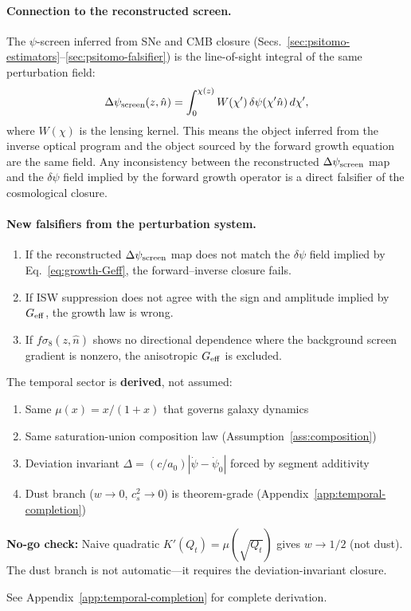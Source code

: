 \paragraph{Connection to the reconstructed screen.}
The $\psi$-screen inferred from SNe and CMB closure (Secs.~\ref{sec:psitomo-estimators}--\ref{sec:psitomo-falsifier}) is the line-of-sight integral of the same perturbation field:
\begin{equation}\label{eq:screen-integral}
\Delta\psi_{\rm screen}(z,\hat{n}) = \int_0^{\chi(z)} W(\chi')\,\delta\psi(\chi'\hat{n})\,d\chi',
\end{equation}
where $W(\chi)$ is the lensing kernel.  This means the object inferred from the inverse optical program and the object sourced by the forward growth equation are the same field.  Any inconsistency between the reconstructed $\Delta\psi_{\rm screen}$ map and the $\delta\psi$ field implied by the forward growth operator is a direct falsifier of the cosmological closure.

\paragraph{New falsifiers from the perturbation system.}
\begin{enumerate}
\item If the reconstructed $\Delta\psi_{\rm screen}$ map does not match the $\delta\psi$ field implied by Eq.~\eqref{eq:growth-Geff}, the forward--inverse closure fails.
\item If ISW suppression does not agree with the sign and amplitude implied by $G_{\rm eff}$, the growth law is wrong.
\item If $f\sigma_8(z,\hat{n})$ shows no directional dependence where the background screen gradient is nonzero, the anisotropic $G_{\rm eff}$ is excluded.
\end{enumerate}

\begin{tcolorbox}[colback=blue!5!white, colframe=blue!60!black, title={Dust Branch from Microsector: Not Bolted-On K-Essence}]
The temporal sector is \textbf{derived}, not assumed:
\begin{enumerate}[nosep]
\item Same $\mu(x) = x/(1+x)$ that governs galaxy dynamics
\item Same saturation-union composition law (Assumption~\ref{ass:composition})
\item Deviation invariant $\Delta = (c/a_0)|\dot\psi - \dot\psi_0|$ forced by segment additivity
\item Dust branch ($w \to 0$, $c_s^2 \to 0$) is theorem-grade (Appendix~\ref{app:temporal-completion})
\end{enumerate}
\textbf{No-go check:} Naive quadratic $K'(Q_t) = \mu(\sqrt{Q_t})$ gives $w \to 1/2$ (not dust). The dust branch is not automatic---it requires the deviation-invariant closure.

See Appendix~\ref{app:temporal-completion} for complete derivation.
\end{tcolorbox}

